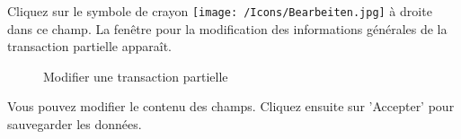 Cliquez sur le symbole de crayon \texttt{[image: /Icons/Bearbeiten.jpg]}  à droite dans ce champ. La fenêtre pour la modification des informations générales de la transaction partielle apparaît.

\begin{figure}[H]
\caption{Modifier une transaction partielle}
\end{figure}

Vous pouvez modifier le contenu des champs. Cliquez ensuite sur 'Accepter'  pour sauvegarder les données.
